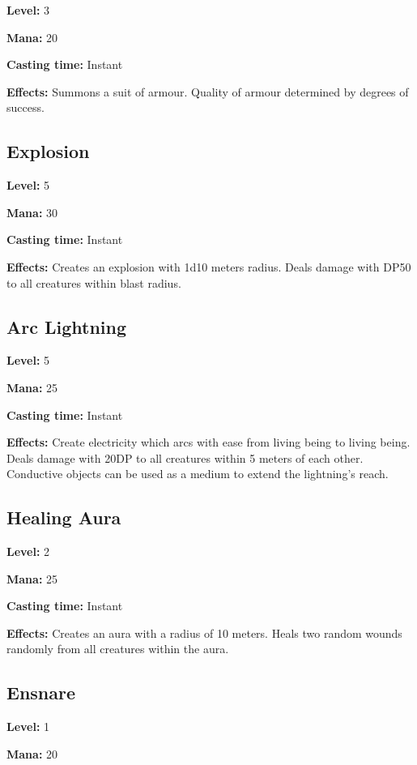 \documentclass[]{article}
\begin{document}
\textbf{Level:} 3

\textbf{Mana:} 20

\textbf{Casting time:} Instant

\textbf{Effects:} Summons a suit of armour. Quality of armour determined
by degrees of success.

\subsection{Explosion}\label{explosion}

\textbf{Level:} 5

\textbf{Mana:} 30

\textbf{Casting time:} Instant

\textbf{Effects:} Creates an explosion with 1d10 meters radius. Deals
damage with DP50 to all creatures within blast radius.

\subsection{Arc Lightning}\label{arc-lightning}

\textbf{Level:} 5

\textbf{Mana:} 25

\textbf{Casting time:} Instant

\textbf{Effects:} Create electricity which arcs with ease from living
being to living being. Deals damage with 20DP to all creatures within 5
meters of each other. Conductive objects can be used as a medium to
extend the lightning's reach.

\subsection{Healing Aura}\label{healing-aura}

\textbf{Level:} 2

\textbf{Mana:} 25

\textbf{Casting time:} Instant

\textbf{Effects:} Creates an aura with a radius of 10 meters. Heals two
random wounds randomly from all creatures within the aura.

\subsection{Ensnare}\label{ensnare}

\textbf{Level:} 1

\textbf{Mana:} 20
\end{document}
